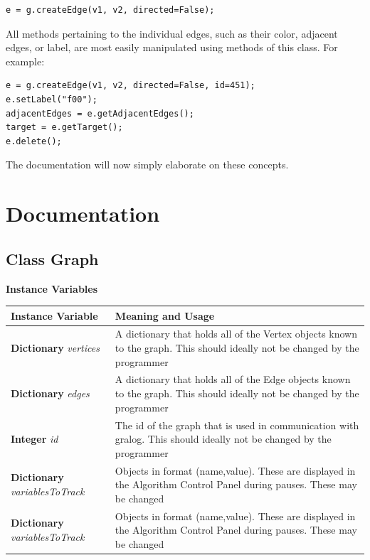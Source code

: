 \documentclass{article}
\newlength\q
\begin{document}
\begin{lstlisting}
e = g.createEdge(v1, v2, directed=False);
\end{lstlisting}

All methods pertaining to the individual edges, such as their color, adjacent edges, or label, are most easily manipulated using methods of this class. For example:

\begin{lstlisting}
e = g.createEdge(v1, v2, directed=False, id=451);
e.setLabel("f00");
adjacentEdges = e.getAdjacentEdges();
target = e.getTarget();
e.delete();
\end{lstlisting}

The documentation will now simply elaborate on these concepts.

\section{Documentation}

\subsection{Class Graph}

\textbf{{\large Instance Variables}}


\begin{longtable}{p{\q}p{\q}}
Instance Variable & Meaning and Usage \\ \hline
\textbf{Dictionary} \textit{vertices} & A dictionary that holds all of the Vertex objects known to the graph. This should ideally not be changed by the programmer \\\hline
\textbf{Dictionary} \textit{edges} & A dictionary that holds all of the Edge objects known to the graph. This should ideally not be changed by the programmer \\\hline
\textbf{Integer} \textit{id} & The id of the graph that is used in communication with gralog. This should ideally not be changed by the programmer \\ \hline
\textbf{Dictionary} \textit{variablesToTrack} & Objects in format (name,value). These are displayed in the Algorithm Control Panel during pauses. These may be changed \\ \hline
\textbf{Dictionary} \textit{variablesToTrack} & Objects in format (name,value). These are displayed in the Algorithm Control Panel during pauses. These may be changed \\ \hline
\end{longtable}
\end{document}
